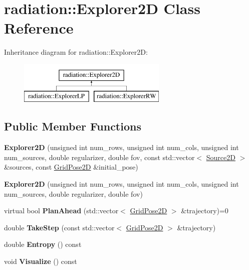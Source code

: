 \hypertarget{classradiation_1_1_explorer2_d}{}\section{radiation\+:\+:Explorer2D Class Reference}
\label{classradiation_1_1_explorer2_d}
Inheritance diagram for radiation\+:\+:Explorer2D\+:\begin{figure}[H]
\begin{center}
\leavevmode
\includegraphics[height=2.000000cm]{classradiation_1_1_explorer2_d}
\end{center}
\end{figure}
\subsection*{Public Member Functions}
\begin{DoxyCompactItemize}
\item 
\hypertarget{classradiation_1_1_explorer2_d_a7caa50fec51ce47cf9ee96400496b334}{}\label{classradiation_1_1_explorer2_d_a7caa50fec51ce47cf9ee96400496b334} 
{\bfseries Explorer2D} (unsigned int num\+\_\+rows, unsigned int num\+\_\+cols, unsigned int num\+\_\+sources, double regularizer, double fov, const std\+::vector$<$ \hyperlink{classradiation_1_1_source2_d}{Source2D} $>$ \&sources, const \hyperlink{classradiation_1_1_grid_pose2_d}{Grid\+Pose2D} \&initial\+\_\+pose)
\item 
\hypertarget{classradiation_1_1_explorer2_d_ad16e982f1455a8813c02e4efbbfbdc29}{}\label{classradiation_1_1_explorer2_d_ad16e982f1455a8813c02e4efbbfbdc29} 
{\bfseries Explorer2D} (unsigned int num\+\_\+rows, unsigned int num\+\_\+cols, unsigned int num\+\_\+sources, double regularizer, double fov)
\item 
\hypertarget{classradiation_1_1_explorer2_d_a383dd22050fca3ee0bd47f746f571189}{}\label{classradiation_1_1_explorer2_d_a383dd22050fca3ee0bd47f746f571189} 
virtual bool {\bfseries Plan\+Ahead} (std\+::vector$<$ \hyperlink{classradiation_1_1_grid_pose2_d}{Grid\+Pose2D} $>$ \&trajectory)=0
\item 
\hypertarget{classradiation_1_1_explorer2_d_a406e0a334d57aa05cf1a37bcd4b1fcec}{}\label{classradiation_1_1_explorer2_d_a406e0a334d57aa05cf1a37bcd4b1fcec} 
double {\bfseries Take\+Step} (const std\+::vector$<$ \hyperlink{classradiation_1_1_grid_pose2_d}{Grid\+Pose2D} $>$ \&trajectory)
\item 
\hypertarget{classradiation_1_1_explorer2_d_ac78860771fe00720a8024ef06a1b13b3}{}\label{classradiation_1_1_explorer2_d_ac78860771fe00720a8024ef06a1b13b3} 
double {\bfseries Entropy} () const
\item 
\hypertarget{classradiation_1_1_explorer2_d_a8eaf1135c2d720ac185b4afbb852feee}{}\label{classradiation_1_1_explorer2_d_a8eaf1135c2d720ac185b4afbb852feee} 
void {\bfseries Visualize} () const
\end{DoxyCompactItemize}
